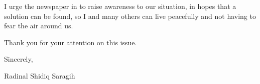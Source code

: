 \documentclass[11pt, a4paper]{article}
\begin{document}
\begin{flushleft}
    \vspace{0.2cm}

    I urge the newspaper in to raise awareness to our situation,
    in hopes that a solution can be found, so I and many others can
    live peacefully and not having to fear the air around us.

    \vspace{0.5cm}

    Thank you for your attention on this issue.

    \vspace{0.2cm}

    Sincerely,

    Radinal Shidiq Saragih
  \end{flushleft}
\end{document}
